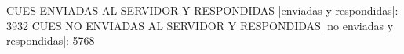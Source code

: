 CUES ENVIADAS AL SERVIDOR Y RESPONDIDAS
|enviadas y respondidas|: 3932
CUES NO ENVIADAS AL SERVIDOR Y RESPONDIDAS
|no enviadas y respondidas|: 5768